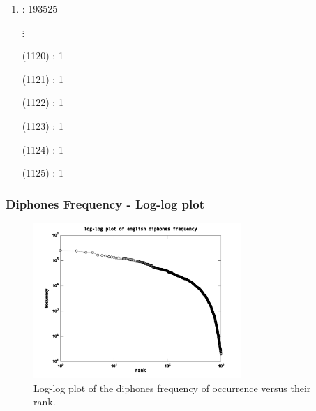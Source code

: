 \documentclass[notes]{beamer}
\begin{document}
{\begin{tiny}
\begin{multicols}{4}
\begin{enumerate}
    \item {} : 193525
	\item[] $\vdots$
	\item[(1120)]  : 1
	\item[(1121)]  : 1
	\item[(1122)]  : 1
	\item[(1123)]  : 1
	\item[(1124)]  : 1
	\item[(1125)]  : 1
\end{enumerate}
\end{multicols}
\end{tiny}
}



\frame
{
  \frametitle{Diphones Frequency - Log-log plot}
\begin{figure}[h!]
\centering
\includegraphics[width=0.7\textwidth]{images/diphonesfrequency_en.pdf}
\caption{Log-log plot of the diphones frequency of occurrence versus their rank.}
\label{fig:diphonesfrequency_en}
\end{figure} 
}
\end{document}
